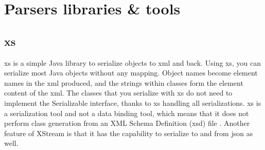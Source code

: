 \section{Parsers libraries \& tools}

\subsection{\gls{xs}}
\gls{xs} is a simple Java library to serialize objects to \gls{xml} and back. Using \gls{xs}, you can serialize most Java objects without any mapping. Object names become element names in the \gls{xml} produced, and the strings within classes form the element content of the \gls{xml}.
\newline
\newline
The classes that you serialize with \gls{xs} do not need to implement the Serializable interface, thanks to \gls{xs} handling all serializations. \gls{xs} is a serialization tool and not a data binding tool, which means that it does not perform class generation from an XML Schema Definition (\gls{xsd}) file \cite{bib:xstream} \cite{bib:ibm}.
\newline
\newline
Another feature of XStream is that it has the capability to serialize to and from \gls{json} as well.